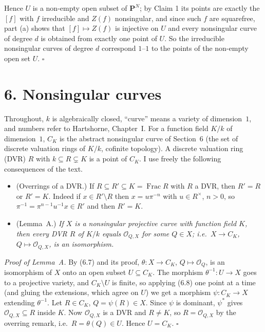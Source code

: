 \documentclass[11pt]{article}
\begin{document}
Hence $U$ is a non-empty open subset of $\mathbf P^N$; by Claim 1 its points are exactly the $[f]$ with $f$ irreducible and $Z(f)$ nonsingular, and since such $f$ are squarefree, part (a) shows that $[f]\mapsto Z(f)$ is injective on $U$ and every nonsingular curve of degree $d$ is obtained from exactly one point of $U$. So the irreducible nonsingular curves of degree $d$ correspond $1$--$1$ to the points of the non-empty open set $U$. \hfill$\square$

\section*{6. Nonsingular curves}

Throughout, $k$ is algebraically closed, ``curve'' means a variety of dimension~$1$, and numbers refer to Hartshorne, Chapter~I. For a function field $K/k$ of dimension~$1$, $C_K$ is the abstract nonsingular curve of Section~6 (the set of discrete valuation rings of $K/k$, cofinite topology). A discrete valuation ring (DVR) $R$ with $k\subseteq R\subsetneq K$ is a point of $C_K$. I use freely the following consequences of the text.

\begin{itemize}
\item (Overrings of a DVR.) If $R\subseteq R'\subseteq K=\operatorname{Frac}R$ with $R$ a DVR, then $R'=R$ or $R'=K$. Indeed if $x\in R'\setminus R$ then $x=u\pi^{-n}$ with $u\in R^\times$, $n>0$, so $\pi^{-1}=\pi^{n-1}u^{-1}x\in R'$ and then $R'=K$.
\item (Lemma~A.) \emph{If $X$ is a nonsingular projective curve with function field $K$, then every DVR $R$ of $K/k$ equals $\mathcal O_{Q,X}$ for some $Q\in X$; i.e.\ $X\to C_K$, $Q\mapsto\mathcal O_{Q,X}$, is an isomorphism.}
\end{itemize}
\emph{Proof of Lemma~A.} By (6.7) and its proof, $\theta:X\to C_K$, $Q\mapsto\mathcal O_Q$, is an isomorphism of $X$ onto an open subset $U\subseteq C_K$. The morphism $\theta^{-1}:U\to X$ goes to a projective variety, and $C_K\setminus U$ is finite, so applying (6.8) one point at a time (and gluing the extensions, which agree on $U$) we get a morphism $\psi:C_K\to X$ extending $\theta^{-1}$. Let $R\in C_K$, $Q=\psi(R)\in X$. Since $\psi$ is dominant, $\psi^*$ gives $\mathcal O_{Q,X}\subseteq R$ inside $K$. Now $\mathcal O_{Q,X}$ is a DVR and $R\ne K$, so $R=\mathcal O_{Q,X}$ by the overring remark, i.e.\ $R=\theta(Q)\in U$. Hence $U=C_K$. \hfill$\square$
\end{document}
